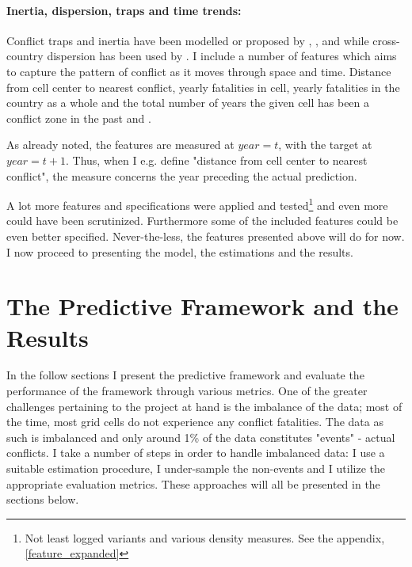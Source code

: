\documentclass[a4paper]{article}
\begin{document}
\paragraph{Inertia, dispersion, traps and time trends:} Conflict traps and inertia have been modelled or proposed by \cite{Collier_Hoeffler_2004}, \cite{Hegre_Sambanis_2006}, \cite{perry_2013} and \cite{Cederman_Gleditsch_Buhaug_2013} while cross-country dispersion has been used by \cite{Goldstone_2010}. I include a number of features which aims to capture the pattern of conflict as it moves through space and time. Distance from cell center to nearest conflict, yearly fatalities in cell, yearly fatalities in the country as a whole and the total number of years the given cell has been a conflict zone in the past and .\par

As already noted, the features are measured at $year = t$, with the target at $year = t+1$. Thus, when I e.g. define "distance from cell center to nearest conflict", the measure concerns the year preceding the actual prediction.\par

A lot more features and specifications were applied and tested\footnote{Not least logged variants and various density measures. See the appendix, \autoref{feature_expanded}} and even more could have been scrutinized. Furthermore some of the included features could be even better specified. Never-the-less, the features presented above will do for now. I now proceed to presenting the model, the estimations and the results.

\section{The Predictive Framework and the Results}

In the follow sections I present the predictive framework and evaluate the performance of the framework through various metrics. One of the greater challenges pertaining to the project at hand is the imbalance of the data; most of the time, most grid cells do not experience any conflict fatalities. The data as such is imbalanced and only around 1\% of the data constitutes "events" - actual conflicts. I take a number of steps in order to handle imbalanced data: I use a suitable estimation procedure, I under-sample the non-events and I utilize the appropriate evaluation metrics. These approaches will all be presented in the sections below.\par
\end{document}
